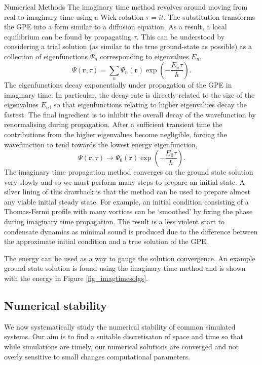 \begin{chapter}{\label{cha:numerics}Numerical Methods}
	The imaginary time method revolves around moving from real to imaginary time using a Wick rotation $\tau = it$. The substitution transforms the GPE into a form similar to a diffusion equation. As a result, a local equilibrium can be found by propagating $\tau$. This can be understood by considering a trial solution (as similar to the true ground-state as possible) as a collection of eigenfunctions $\Psi_n$ corresponding to eigenvalues $E_n$,
\begin{equation*}
\Psi(\mathbf{r},\tau) = \sum_n \Psi_n(\mathbf{r})\exp\left(-\frac{E_n\tau}{\hbar}\right).
\end{equation*}
The eigenfunctions decay exponentially under propagation of the GPE in imaginary time. In particular, the decay rate is directly related to the size of the eigenvalues $E_n$, so that eigenfunctions relating to higher eigenvalues decay the fastest. The final ingredient is to inhibit the overall decay of the wavefunction by renormalising during propagation. After a sufficient transient time the contributions from the higher eigenvalues become negligible, forcing the wavefunction to tend towards the lowest energy eigenfunction,
\begin{equation*}
\Psi(\mathbf{r},\tau) \rightarrow \Psi_0(\mathbf{r})\exp\left(-\frac{E_0\tau}{\hbar}\right).
\end{equation*}
The imaginary time propagation method converges on the ground state solution very slowly and so we must perform many steps to prepare an initial state. A silver lining of this drawback is that the method can be used to prepare almost any viable initial steady state. For example, an initial condition consisting of a Thomas-Fermi profile with many vortices can be `smoothed' by fixing the phase during imaginary time propagation. The result is a less violent start to condensate dynamics as minimal sound is produced due to the difference between the approximate initial condition and a true solution of the GPE.

The energy can be used as a way to gauge the solution convergence. An example ground state solution is found using the imaginary time method and is shown with the energy in Figure \ref{fig_imagtimesolgs}. 

	\subsection{\label{section:numericalParams} Numerical stability}
	We now systematically study the numerical stability of common simulated systems. Our aim is to find a suitable discretisaton of space and time so that while simulations are timely, our numerical solutions are converged and not overly sensitive to small changes computational parameters.


\end{chapter}
